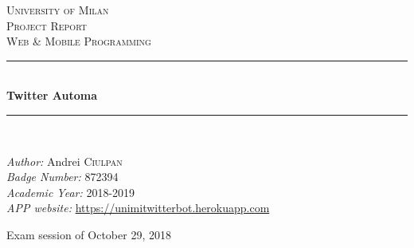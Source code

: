 \documentclass[12pt]{article} %
\begin{document}

\begin{titlepage}

\newcommand{\HRule}{\rule{\linewidth}{0.7mm}} %

\center %

\textsc{\LARGE University of Milan}\\[1.5cm] %
\textsc{\Large Project Report}\\[0.5cm] %
\textsc{\large Web \& Mobile Programming}\\[0.5cm] %

\HRule \\[1.0cm]
{ \huge \bfseries Twitter Automa}\\[0.4cm] %
\HRule \\[1.5cm]
\vspace{2mm} %
 
\large \emph{Author:} Andrei \textsc{Ciulpan} %
\\[0.3cm]
\large \emph{Badge Number:} 872394    %
\\[0.3cm]
\large \emph{Academic Year:} 2018-2019    %
\\[0.3cm]
\large \emph{APP website:} \url{https://unimitwitterbot.herokuapp.com}   %
 
\vfill %

{\large Exam session of October 29, 2018}\\[3cm] %



\end{titlepage}


\tableofcontents %
\end{document}

